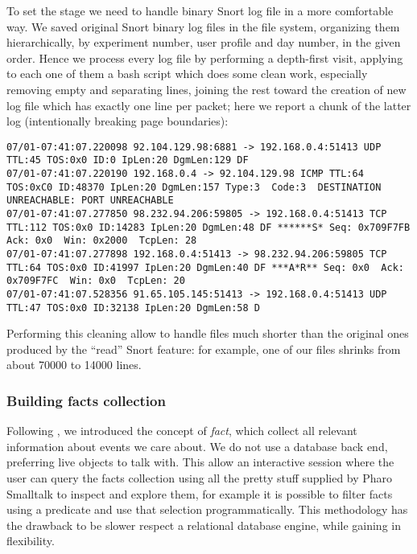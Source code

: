 \documentclass[10pt,a4paper]{article}
\begin{document}
    To set the stage we need to handle binary Snort log file in a more
    comfortable way. We saved original Snort binary log files in the
    file system, organizing them hierarchically, by experiment number,
    user profile and day number, in the given order. Hence we process
    every log file by performing a depth-first visit, applying to each
    one of them a bash script which does some clean work, especially
    removing empty and separating lines, joining the rest toward the
    creation of new log file which has exactly one line per packet;
    here we report a chunk of
    the latter log (intentionally breaking page boundaries): 
    \begin{adjustwidth}{-4cm}{}
\begin{verbatim}
07/01-07:41:07.220098 92.104.129.98:6881 -> 192.168.0.4:51413 UDP TTL:45 TOS:0x0 ID:0 IpLen:20 DgmLen:129 DF
07/01-07:41:07.220190 192.168.0.4 -> 92.104.129.98 ICMP TTL:64 TOS:0xC0 ID:48370 IpLen:20 DgmLen:157 Type:3  Code:3  DESTINATION UNREACHABLE: PORT UNREACHABLE
07/01-07:41:07.277850 98.232.94.206:59805 -> 192.168.0.4:51413 TCP TTL:112 TOS:0x0 ID:14283 IpLen:20 DgmLen:48 DF ******S* Seq: 0x709F7FB  Ack: 0x0  Win: 0x2000  TcpLen: 28
07/01-07:41:07.277898 192.168.0.4:51413 -> 98.232.94.206:59805 TCP TTL:64 TOS:0x0 ID:41997 IpLen:20 DgmLen:40 DF ***A*R** Seq: 0x0  Ack: 0x709F7FC  Win: 0x0  TcpLen: 20
07/01-07:41:07.528356 91.65.105.145:51413 -> 192.168.0.4:51413 UDP TTL:47 TOS:0x0 ID:32138 IpLen:20 DgmLen:58 D
\end{verbatim}
    \end{adjustwidth}

    Performing this cleaning allow to handle files much shorter than
    the original ones produced by the ``read'' Snort feature: for
    example, one of our files shrinks from about 70000 to 14000 lines.

    \subsubsection{Building facts collection}

    Following \cite{bondavalli}, we introduced the concept of
    \emph{fact}, which collect all relevant information about events
    we care about. We do not use a database back end, preferring live
    objects to talk with. This allow an interactive session where the
    user can query the facts collection using all the pretty stuff
    supplied by Pharo Smalltalk to inspect and explore them, for
    example it is possible to filter facts using a predicate and use
    that selection programmatically. This methodology has the drawback
    to be slower respect a relational database engine, while gaining
    in flexibility.
\end{document}
